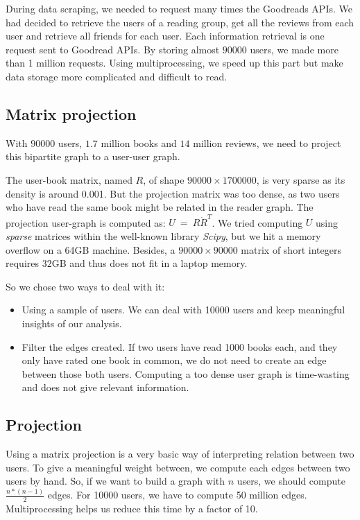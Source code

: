 \documentclass[11pt]{article}
\begin{document}
During data scraping, we needed to request many times the Goodreads APIs.
We had decided to retrieve the users of a reading group, get all the reviews from each user and retrieve all friends for each user.
Each information retrieval is one request sent to Goodread APIs.
By storing almost $90000$ users, we made more than 1 million requests. Using multiprocessing, we speed up this part but make data storage more complicated and difficult to read.

\subsection{Matrix projection}

With $90000$ users, $1.7$ million books and $14$ million reviews, we need to project this bipartite graph to a user-user graph.

The user-book matrix, named $R$, of shape $90000 \times 1700000$, is very sparse as its density is around 0.001. But the projection matrix was too dense, as two users who have read the same book might be related in the reader graph.
The projection user-graph is computed as: $U~=~R \dot R^T$.
We tried computing $U$ using \emph{sparse} matrices within the well-known library \emph{Scipy}\cite{scipy}, but we hit a memory overflow on a 64GB machine.
Besides, a $90000 \times 90000$ matrix of short integers requires $32$GB and thus does not fit in a laptop memory.

So we chose two ways to deal with it:
\begin{itemize}
\item Using a sample of users. We can deal with 10000 users and keep meaningful insights of our analysis.
\item Filter the edges created. If two users have read 1000 books each, and they only have rated one book in common, we do not need to create an edge between those both users. Computing a too dense user graph is time-wasting and does not give relevant information.
\end{itemize}

\subsection{Projection}

Using a matrix projection is a very basic way of interpreting relation between two users. To give a meaningful weight between, we compute each edges between two users by hand. So, if we want to build a graph with $n$ users, we should compute $\frac{n * (n-1)}{2}$ edges. 
For 10000 users, we have to compute 50 million edges. Multiprocessing helps us reduce this time by a factor of 10.
\end{document}
